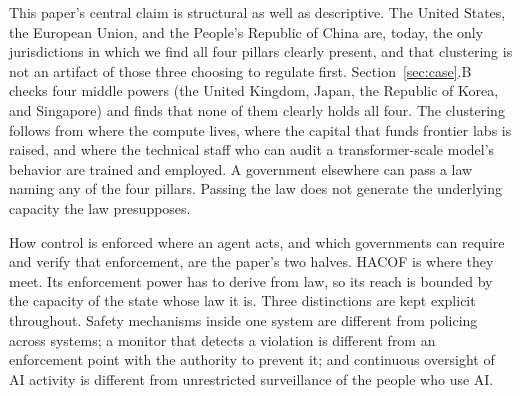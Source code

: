 \documentclass{ieeeaccess}
\newcommand{\hacof}{HACOF}
\begin{document}
This paper's central claim is structural as well as descriptive. The United States, the European Union, and the People's Republic of China are, today, the only jurisdictions in which we find all four pillars clearly present, and that clustering is not an artifact of those three choosing to regulate first. Section~\ref{sec:case}.B checks four middle powers (the United Kingdom, Japan, the Republic of Korea, and Singapore) and finds that none of them clearly holds all four. The clustering follows from where the compute lives, where the capital that funds frontier labs is raised, and where the technical staff who can audit a transformer-scale model's behavior are trained and employed. A government elsewhere can pass a law naming any of the four pillars. Passing the law does not generate the underlying capacity the law presupposes.

How control is enforced where an agent acts, and which governments can require and verify that enforcement, are the paper's two halves. \hacof{} is where they meet. Its enforcement power has to derive from law, so its reach is bounded by the capacity of the state whose law it is. Three distinctions are kept explicit throughout. Safety mechanisms inside one system are different from policing across systems; a monitor that detects a violation is different from an enforcement point with the authority to prevent it; and continuous oversight of AI activity is different from unrestricted surveillance of the people who use AI.
\end{document}
